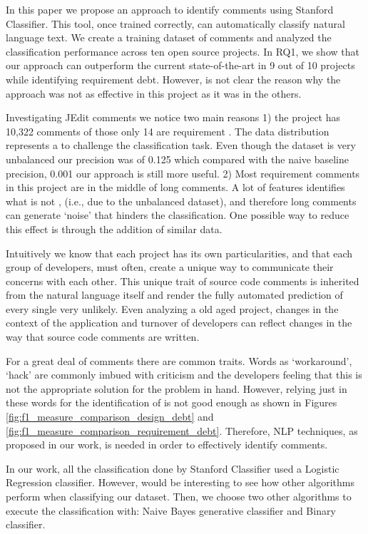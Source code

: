 In this paper we propose an approach to identify \SATD comments using Stanford Classifier. This tool, once trained correctly, can automatically classify natural language text. We create a training dataset of \SATD comments and analyzed the classification performance across ten open source projects. In RQ1, we show that our approach can outperform the current state-of-the-art in 9 out of 10 projects while identifying requirement debt. However, is not clear the reason why the approach was not as effective in this project as it was in the others.

Investigating JEdit comments we notice two main reasons 1) the project has 10,322 comments of those only 14 are requirement \SATD. The data distribution represents a to challenge the classification task. Even though the dataset is very unbalanced our precision was of 0.125 which compared with the naive baseline precision, 0.001 our approach is still more useful. 2) Most requirement \SATD comments in this project are in the middle of long comments. A lot of features identifies what is not \SATD, (i.e., due to the unbalanced dataset), and therefore long comments can generate `noise' that hinders the classification. One possible way to reduce this effect is through the addition of similar data. 

Intuitively we know that each project has its own particularities, and that each group of developers, must often, create a unique way to communicate their concerns with each other. This unique trait of source code comments is inherited from the natural language itself and render the fully automated prediction of every single \SATD very unlikely. Even analyzing a old aged project, changes in the context of the application and turnover of developers can reflect changes in the way that source code comments are written. 

For a great deal of \SATD comments there are common traits. Words as `workaround', `hack' are commonly imbued with criticism and the developers feeling that this is not the appropriate solution for the problem in hand. However, relying just in these words for the identification of \SATD is not good enough as shown in Figures \ref{fig:f1_measure_comparison_design_debt} and \ref{fig:f1_measure_comparison_requirement_debt}. Therefore, NLP techniques, as proposed in our work, is needed in order to effectively identify \SATD comments.

In our work, all the classification done by Stanford Classifier used a Logistic Regression classifier. However, would be interesting to see how other  algorithms perform when classifying our dataset. Then, we choose two other algorithms to execute the classification with: Naive Bayes generative classifier and Binary classifier.

